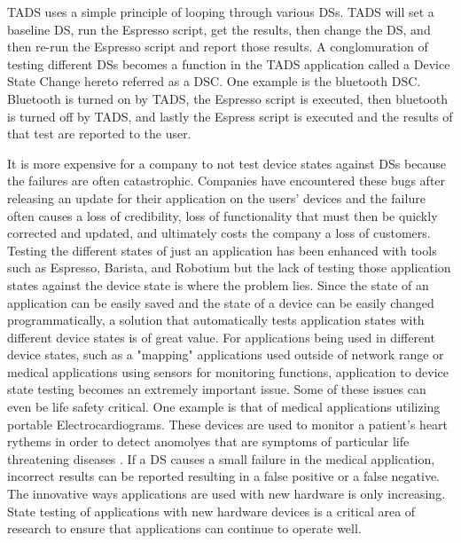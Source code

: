 TADS uses a simple principle of looping through various DSs.  TADS will set a baseline DS, run the Espresso script, get the results, then change the DS, and then re-run the Espresso script and report those results.  A conglomuration of testing different DSs becomes a function in the TADS application called a Device State Change hereto referred as a DSC.  One example is the bluetooth DSC.  Bluetooth is turned on by TADS, the Espresso script is executed, then bluetooth is turned off by TADS, and lastly the Espress script is executed and the results of that test are reported to the user.

It is more expensive for a company to not test device states against DSs because the failures are often catastrophic.  Companies have encountered these bugs after releasing an update for their application on the users' devices and the failure often causes a loss of credibility, loss of functionality that must then be quickly corrected and updated, and ultimately costs the company a loss of customers.  Testing the different states of just an application has been enhanced with tools such as Espresso, Barista, and Robotium \cite{optimusinformationinc2016} but the lack of testing those application states against the device state is where the problem lies.  Since the state of an application can be easily saved and the state of a device can be easily changed programmatically, a solution that automatically tests application states with different device states is of great value.  For applications being used in different device states, such as a "mapping" applications used outside of network range or medical applications using sensors for monitoring functions, application to device state testing becomes an extremely important issue.  Some of these issues can even be life safety critical.  One example is that of medical applications utilizing portable Electrocardiograms.  These devices are used to monitor a patient's heart rythems in order to detect anomolyes that are symptoms of particular life threatening diseases \cite{medical eval paper}.  If a DS causes a small failure in the medical application, incorrect results can be reported resulting in a false positive or a false negative.  The innovative ways applications are used with new hardware is only increasing.  State testing of applications with new hardware devices is a critical area of research to ensure that applications can continue to operate well. 

